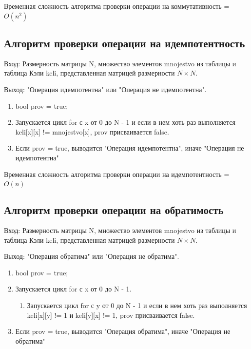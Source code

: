 \documentclass[bachelor, och, labwork]{shiza}
\begin{document}
	Временная сложность алгоритма проверки операции на коммутативность = $O(n^2)$	
	
	\subsection{Алгоритм проверки операции на идемпотентность}
	
	$\textit{Вход:}$ Размерность матрицы N, множество элементов mnojestvo из таблицы и таблица Кэли keli, представленная матрицей размерности $N \times N$.
	
	$\textit{Выход:}$  "Операция идемпотентна" или "Операция не идемпотентна".
	
	\begin{enumerate} 
		\item bool prov = true;
		\item Запускается цикл for с x от 0 до N - 1 и если в нем хоть раз выполняется keli[x][x] != mnojestvo[x], prov присваивается false.
		\item Если prov = true, выводится "Операция идемпотентна", иначе "Операция не идемпотентна"
	\end{enumerate} 

	Временная сложность алгоритма проверки операции на идемпотентность = $O(n)$		
	
	\subsection{Алгоритм проверки операции на обратимость}	
	
	$\textit{Вход:}$ Размерность матрицы N, множество элементов mnojestvo из таблицы и таблица Кэли keli, представленная матрицей размерности $N \times N$.

	$\textit{Выход:}$  "Операция обратима" или "Операция не обратима".	
		
	\begin{enumerate} 
		\item bool prov = true;
		\item Запускается цикл for с x от 0 до N - 1.
		\begin{enumerate} 
			\item Запускается цикл for с y от 0 до N - 1 и если в нем хоть раз выполняется keli[x][y] != 1 и keli[y][x] != 1, prov присваивается false.
		\end{enumerate}
		\item Если prov = true, выводится "Операция обратима", иначе "Операция не обратима"
	\end{enumerate} 
	
\end{document}
